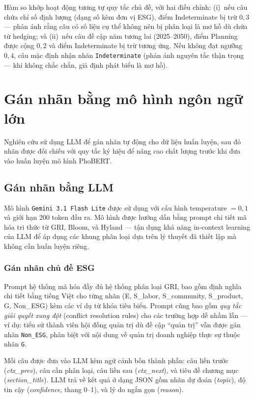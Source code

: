 Hàm so khớp hoạt động tương tự quy tắc chủ đề, với hai điều chỉnh: (i)~nếu câu chứa chỉ số định lượng (dạng số kèm đơn vị ESG), điểm Indeterminate bị trừ $0{,}3$ --- phản ánh rằng câu có số liệu cụ thể không nên bị phân loại là mơ hồ dù chứa từ hedging; và (ii)~nếu câu đề cập năm tương lai (2025--2050), điểm Planning được cộng $0{,}2$ và điểm Indeterminate bị trừ tương ứng. Nếu không đạt ngưỡng $0{,}4$, câu mặc định nhận nhãn \texttt{Indeterminate} (phản ánh nguyên tắc thận trọng --- khi không chắc chắn, giả định phát biểu là mơ hồ).

\section{Gán nhãn bằng mô hình ngôn ngữ lớn}
\label{sec:labeling}

Nghiên cứu sử dụng LLM để gán nhãn tự động cho dữ liệu huấn luyện, sau đó nhãn được đối chiếu với quy tắc ký hiệu để nâng cao chất lượng trước khi đưa vào huấn luyện mô hình PhoBERT.


\subsection{Gán nhãn bằng LLM}
\label{subsec:llm_labeling}

Mô hình \texttt{Gemini 3.1 Flash Lite} được sử dụng với cấu hình temperature $= 0{,}1$ và giới hạn 200 token đầu ra. Mô hình được hướng dẫn bằng prompt chi tiết mã hóa tri thức từ GRI, Bloom, và Hyland --- tận dụng khả năng in-context learning của LLM để áp dụng các khung phân loại dựa trên lý thuyết đã thiết lập mà không cần huấn luyện riêng.

\subsubsection{Gán nhãn chủ đề ESG}

Prompt hệ thống mã hóa đầy đủ hệ thống phân loại GRI, bao gồm định nghĩa chi tiết bằng tiếng Việt cho từng nhãn (E, S\_labor, S\_community, S\_product, G, Non\_ESG) kèm các ví dụ từ khóa tiêu biểu. Prompt cũng bao gồm \textit{quy tắc giải quyết xung đột} (conflict resolution rules) cho các trường hợp dễ nhầm lẫn --- ví dụ: tiểu sử thành viên hội đồng quản trị dù đề cập ``quản trị'' vẫn được gán nhãn \texttt{Non\_ESG}, phân biệt với nội dung về quản trị doanh nghiệp thực sự thuộc nhãn \texttt{G}.

Mỗi câu được đưa vào LLM kèm ngữ cảnh bốn thành phần: câu liền trước (\textit{ctx\_prev}), câu cần phân loại, câu liền sau (\textit{ctx\_next}), và tiêu đề chương mục (\textit{section\_title}). LLM trả về kết quả ở dạng JSON gồm nhãn dự đoán (\textit{topic}), độ tin cậy (\textit{confidence}, thang 0--1), và lý do ngắn gọn (\textit{reason}).

